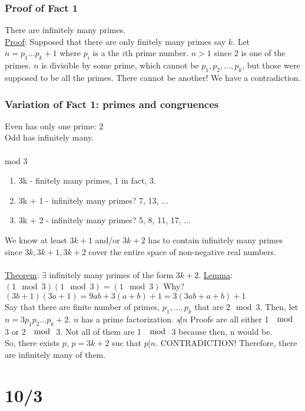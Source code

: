 \documentclass[13pt]{article}
\begin{document}
		\subsubsection*{Proof of Fact 1}
			There are infinitely many primes.\\
			\underline{Proof}: Supposed that there are only finitely many primes
			say $k$. Let $n = p_1\dots p_k + 1$ where $p_i$ is a the $i$th prime 
			number. $n > 1$ since 2 is one of the primes. $n$ is divisible by
			some prime, which cannot be $p_1, p_2, \ldots, p_k$, but those
			were supposed to be all the primes. There cannot be another! We
			have a contradiction. 
		\subsubsection*{Variation of Fact 1: primes and congruences}
			Even has only one prime: 2\\
			Odd has infinitely many.\\\\
			mod 3
			\begin{enumerate}
				\item 3k - finitely many primes, 1 in fact, 3.
				\item 3k + 1 - infinitely many primes? 7, 13, $\ldots$
				\item 3k + 2 - infinitely many primes? 5, 8, 11, 17, $\ldots$
			\end{enumerate}
			We know at least $3k+1$ and/or $3k+2$ has to contain infinitely
			many primes since $3k, 3k +1 , 3k +2 $ cover the entire space of
			non-negative real numbers.\\\\
			\underline{Theorem}: $\exists$ infinitely many primes of the form 
			$3k+2$.
			\underline{Lemma}: $(1 \mod 3)(1 \mod 3) = (1 \mod 3)$ Why?
			$(3b + 1)(3a + 1) = 9ab + 3(a + b) + 1 = 3(3ab + a + b) + 1$ \\
			Say that there are finite number of primes, $p_1, \ldots, p_k$ that
			are $2 \mod 3$. Then, let $n = 3p_1p_2\ldots p_k + 2$. $n$ has a prime
			factorization. $s \not| n$ Proofs are all either 1 $\mod$ 3 or 2 $\mod$
			3. Not all of them are 1 $\mod$ 3 because then, n would be.\\
			So, there exists $p$, $p = 3k +2$ suc that $p | n$. CONTRADICTION!
			Therefore, there are infinitely many of them.

\section*{10/3}
\end{document}
